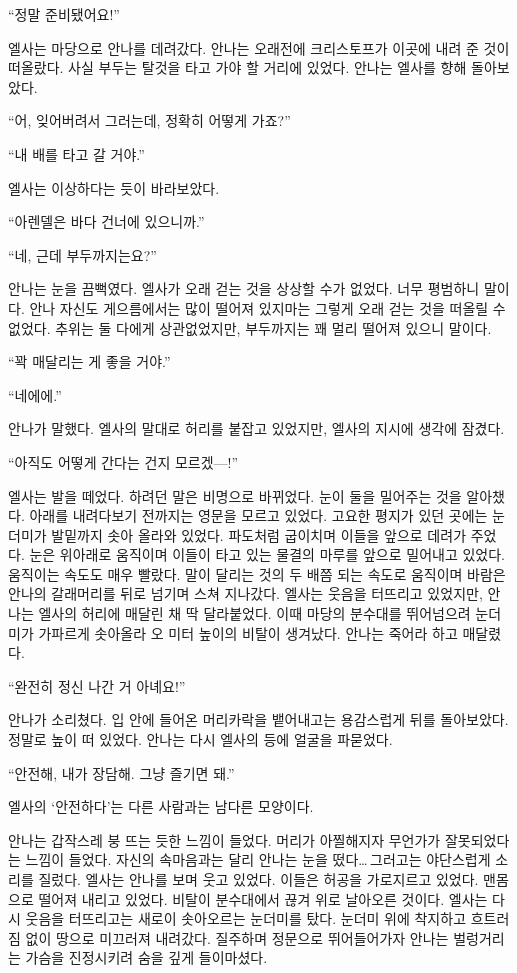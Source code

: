 ``정말 준비됐어요!''

엘사는 마당으로 안나를 데려갔다. 안나는 오래전에 크리스토프가 이곳에 내려 준 것이 떠올랐다. 사실 부두는 탈것을 타고 가야 할 거리에 있었다. 안나는 엘사를 향해 돌아보았다.

``어, 잊어버려서 그러는데, 정확히 어떻게 가죠?''

``내 배를 타고 갈 거야.''

엘사는 이상하다는 듯이 바라보았다.

``아렌델은 바다 건너에 있으니까.''

``네, 근데 부두까지는요?''

안나는 눈을 끔뻑였다. 엘사가 오래 걷는 것을 상상할 수가 없었다. 너무 평범하니 말이다. 안나 자신도 게으름에서는 많이 떨어져 있지마는 그렇게 오래 걷는 것을 떠올릴 수 없었다. 추위는 둘 다에게 상관없었지만, 부두까지는 꽤 멀리 떨어져 있으니 말이다.

``꽉 매달리는 게 좋을 거야.''

``네에에.''

안나가 말했다. 엘사의 말대로 허리를 붙잡고 있었지만, 엘사의 지시에 생각에 잠겼다.

``아직도 어떻게 간다는 건지 모르겠—!''

엘사는 발을 떼었다. 하려던 말은 비명으로 바뀌었다. 눈이 둘을 밀어주는 것을 알아챘다. 아래를 내려다보기 전까지는 영문을 모르고 있었다. 고요한 평지가 있던 곳에는 눈더미가 발밑까지 솟아 올라와 있었다. 파도처럼 굽이치며 이들을 앞으로 데려가 주었다. 눈은 위아래로 움직이며 이들이 타고 있는 물결의 마루를 앞으로 밀어내고 있었다. 움직이는 속도도 매우 빨랐다. 말이 달리는 것의 두 배쯤 되는 속도로 움직이며 바람은 안나의 갈래머리를 뒤로 넘기며 스쳐 지나갔다. 엘사는 웃음을 터뜨리고 있었지만, 안나는 엘사의 허리에 매달린 채 딱 달라붙었다. 이때 마당의 분수대를 뛰어넘으려 눈더미가 가파르게 솟아올라 오 미터 높이의 비탈이 생겨났다. 안나는 죽어라 하고 매달렸다.

``완전히 정신 나간 거 아녜요!''

안나가 소리쳤다. 입 안에 들어온 머리카락을 뱉어내고는 용감스럽게 뒤를 돌아보았다. 정말로 높이 떠 있었다. 안나는 다시 엘사의 등에 얼굴을 파묻었다.

``안전해, 내가 장담해. 그냥 즐기면 돼.''

엘사의 `안전하다'는 다른 사람과는 남다른 모양이다.

안나는 갑작스레 붕 뜨는 듯한 느낌이 들었다. 머리가 아찔해지자 무언가가 잘못되었다는 느낌이 들었다. 자신의 속마음과는 달리 안나는 눈을 떴다\ldots\,그러고는 야단스럽게 소리를 질렀다. 엘사는 안나를 보며 웃고 있었다. 이들은 허공을 가로지르고 있었다. 맨몸으로 떨어져 내리고 있었다. 비탈이 분수대에서 끊겨 위로 날아오른 것이다. 엘사는 다시 웃음을 터뜨리고는 새로이 솟아오르는 눈더미를 탔다. 눈더미 위에 착지하고 흐트러짐 없이 땅으로 미끄러져 내려갔다. 질주하며 정문으로 뛰어들어가자 안나는 벌렁거리는 가슴을 진정시키려 숨을 깊게 들이마셨다.


